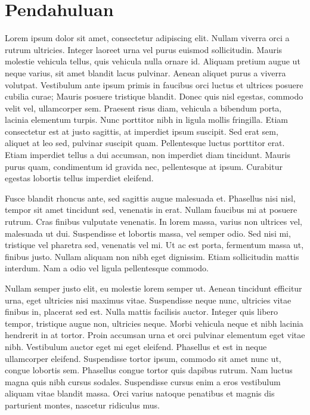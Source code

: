 \chapter{Pendahuluan}

Lorem ipsum dolor sit amet, consectetur adipiscing elit. Nullam viverra orci a rutrum ultricies. Integer laoreet urna vel purus euismod sollicitudin. Mauris molestie vehicula tellus, quis vehicula nulla ornare id. Aliquam pretium augue ut neque varius, sit amet blandit lacus pulvinar. Aenean aliquet purus a viverra volutpat. Vestibulum ante ipsum primis in faucibus orci luctus et ultrices posuere cubilia curae; Mauris posuere tristique blandit. Donec quis nisl egestas, commodo velit vel, ullamcorper sem. Praesent risus diam, vehicula a bibendum porta, lacinia elementum turpis. Nunc porttitor nibh in ligula mollis fringilla. Etiam consectetur est at justo sagittis, at imperdiet ipsum suscipit. Sed erat sem, aliquet at leo sed, pulvinar suscipit quam. Pellentesque luctus porttitor erat. Etiam imperdiet tellus a dui accumsan, non imperdiet diam tincidunt. Mauris purus quam, condimentum id gravida nec, pellentesque at ipsum. Curabitur egestas lobortis tellus imperdiet eleifend.

Fusce blandit rhoncus ante, sed sagittis augue malesuada et. Phasellus nisi nisl, tempor sit amet tincidunt sed, venenatis in erat. Nullam faucibus mi at posuere rutrum. Cras finibus vulputate venenatis. In lorem massa, varius non ultrices vel, malesuada ut dui. Suspendisse et lobortis massa, vel semper odio. Sed nisi mi, tristique vel pharetra sed, venenatis vel mi. Ut ac est porta, fermentum massa ut, finibus justo. Nullam aliquam non nibh eget dignissim. Etiam sollicitudin mattis interdum. Nam a odio vel ligula pellentesque commodo.

Nullam semper justo elit, eu molestie lorem semper ut. Aenean tincidunt efficitur urna, eget ultricies nisi maximus vitae. Suspendisse neque nunc, ultricies vitae finibus in, placerat sed est. Nulla mattis facilisis auctor. Integer quis libero tempor, tristique augue non, ultricies neque. Morbi vehicula neque et nibh lacinia hendrerit in at tortor. Proin accumsan urna et orci pulvinar elementum eget vitae nibh. Vestibulum auctor eget mi eget eleifend. Phasellus et est in neque ullamcorper eleifend. Suspendisse tortor ipsum, commodo sit amet nunc ut, congue lobortis sem. Phasellus congue tortor quis dapibus rutrum. Nam luctus magna quis nibh cursus sodales. Suspendisse cursus enim a eros vestibulum aliquam vitae blandit massa. Orci varius natoque penatibus et magnis dis parturient montes, nascetur ridiculus mus.

